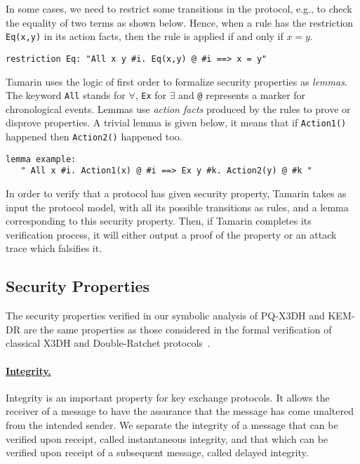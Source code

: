 In some cases, we need to restrict some transitions in the protocol, e.g., to check the equality of two terms as shown below. Hence, when a rule has the restriction \texttt{Eq(x,y)} in its action facts, then the rule is applied if and only if $x = y$.

\begin{Verbatim}
restriction Eq: "All x y #i. Eq(x,y) @ #i ==> x = y"
\end{Verbatim}

Tamarin uses the logic of first order to formalize security properties as \emph{lemmas}. The keyword \texttt{All} stands for $\forall$, \texttt{Ex} for $\exists$ and \texttt{@} represents a marker for chronological events.  Lemmas use \emph{action facts} produced by the rules to prove or disprove properties. A trivial lemma is given below, it means that if \texttt{Action1()} happened then \texttt{Action2()} happened too.

\begin{Verbatim}
lemma example:
   " All x #i. Action1(x) @ #i ==> Ex y #k. Action2(y) @ #k "
\end{Verbatim}

In order to verify that a protocol has given security property, Tamarin takes as input the protocol model, with all its possible transitions as rules, and a lemma corresponding to this security property. Then, if Tamarin completes its verification process, it will either output a proof of the property or an attack trace which falsifies it.


\subsection{Security Properties}

The security properties verified in our symbolic analysis of PQ-X3DH and KEM-DR are the same properties as those considered in the formal verification of classical X3DH and Double-Ratchet protocols~\cite{KobeissiBB17}.

\paragraph{\underline{Integrity.}} Integrity is an important property for key 
exchange protocols. It allows the receiver of a message to have the assurance 
that the message has come unaltered from the intended sender. We separate the 
integrity of a message that can be verified upon receipt, called instantaneous 
integrity, and that which can be verified upon receipt of a subsequent 
message, called delayed integrity.

